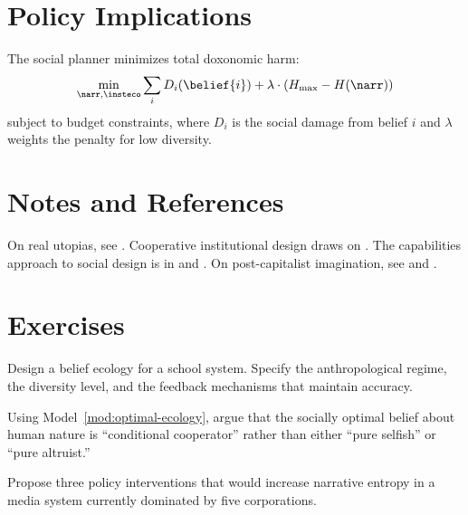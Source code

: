 \section{Policy Implications}
\label{sec:ch33-policy}

\begin{model}
\label{mod:optimal-ecology}
The social planner minimizes total doxonomic harm:
\[
  \min_{\narr, \insteco} \sum_i D_i(\belief{i}) + \lambda \cdot (H_{\max} - H(\narr))
\]
subject to budget constraints, where $D_i$ is the social damage from belief $i$ and $\lambda$ weights the penalty for low diversity.
\end{model}

\section{Notes and References}
\label{sec:ch33-notes}

On real utopias, see \textcite{wright2010}.
Cooperative institutional design draws on \textcite{ostrom1990}.
The capabilities approach to social design is in \textcite{sen1999} and \textcite{nussbaum2011}.
On post-capitalist imagination, see \textcite{mason2015} and \textcite{srnicek2015}.

\section{Exercises}

\begin{exercise}
Design a belief ecology for a school system.
Specify the anthropological regime, the diversity level, and the feedback mechanisms that maintain accuracy.
\end{exercise}

\begin{exercise}
Using Model~\ref{mod:optimal-ecology}, argue that the socially optimal belief about human nature is ``conditional cooperator'' rather than either ``pure selfish'' or ``pure altruist.''
\end{exercise}

\begin{exercise}
Propose three policy interventions that would increase narrative entropy in a media system currently dominated by five corporations.
\end{exercise}
